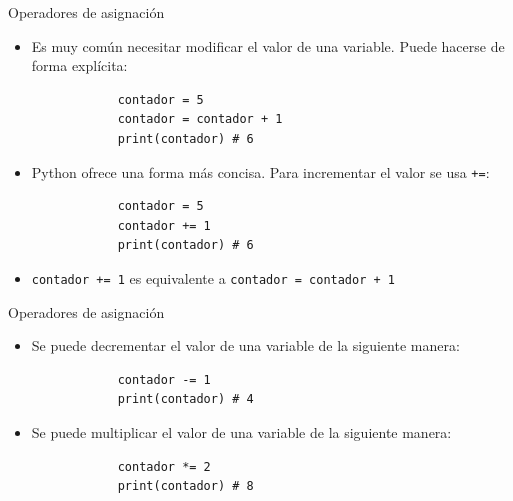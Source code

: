 \documentclass{beamer}
\begin{document}
    \begin{frame}[fragile,t]{Operadores de asignación}
        \begin{itemize}
            \item Es muy común necesitar modificar el valor de una variable. Puede hacerse
            de forma explícita:
            \begin{verbatim}
            contador = 5
            contador = contador + 1
            print(contador) # 6
            \end{verbatim}
            \item Python ofrece una forma más concisa. Para incrementar el valor se usa \texttt{+=}:
            \begin{verbatim}
            contador = 5
            contador += 1
            print(contador) # 6
            \end{verbatim}
            \item \texttt{contador += 1} es equivalente a \texttt{contador = contador + 1}
        \end{itemize}
    \end{frame}

    \begin{frame}[fragile,t]{Operadores de asignación}
        \begin{itemize}
            \item Se puede decrementar el valor de una variable de la siguiente manera:
            \begin{verbatim}
            contador -= 1
            print(contador) # 4
            \end{verbatim}
            \item Se puede multiplicar el valor de una variable de la siguiente manera:
            \begin{verbatim}
            contador *= 2   
            print(contador) # 8
            \end{verbatim}
        \end{itemize}
    \end{frame}
\end{document}
